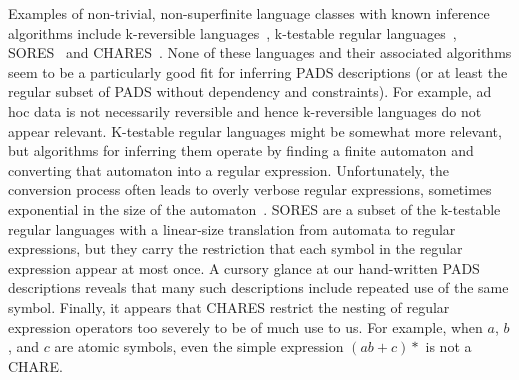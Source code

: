 Examples of non-trivial, non-superfinite
language classes with known inference algorithms include
k-reversible languages~\cite{angluin:revesible-language-inference},
k-testable regular languages~\cite{garcia+:k-testable-languages},
SORES~\cite{bex+:dtd-inference} and CHARES~\cite{bex+:dtd-inference}.
None of these languages and their associated algorithms seem to be 
a particularly good fit for inferring PADS descriptions (or at least the
regular subset of PADS without dependency and constraints).  
For example, ad hoc data
is not necessarily reversible and hence k-reversible languages
do not appear relevant.  K-testable regular languages might be somewhat
more relevant, but algorithms for inferring them
operate by finding a finite automaton and converting that 
automaton into a regular expression.  Unfortunately, the conversion process
often leads to overly verbose regular expressions, sometimes 
exponential in the size of the 
automaton~\cite{bex+:dtd-inference}.  SORES are a subset of the k-testable
regular languages with a linear-size translation from automata to
regular expressions, but they carry the restriction that each symbol
in the regular expression appear at most once.  A cursory glance at
our hand-written PADS descriptions reveals that many such descriptions
include repeated use of the same symbol.  Finally, it appears that
CHARES restrict the nesting of regular expression operators too severely to 
be of much use to us.  For example, when $a$, $b$, and $c$ are atomic symbols,
even the simple expression $(ab + c)*$ is not a CHARE.

